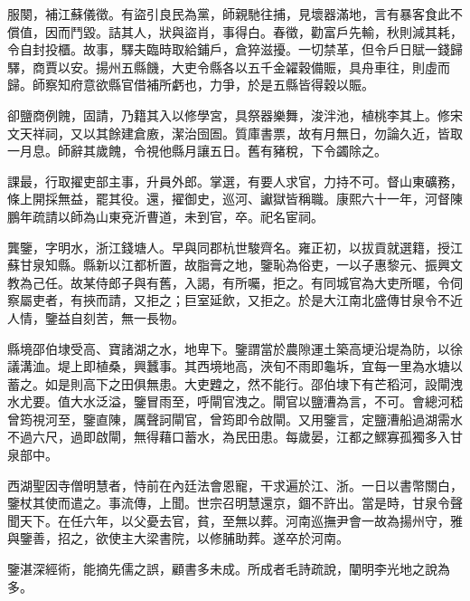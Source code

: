 \begin{pinyinscope}
服闋，補江蘇儀徵。有盜引良民為黨，師親馳往捕，見壞器滿地，言有暴客食此不償值，因而鬥毀。詰其人，狀與盜肖，事得白。春徵，勸富戶先輸，秋則減其耗，令自封投櫃。故事，驛夫臨時取給鋪戶，倉猝滋擾。一切禁革，但令戶日賦一錢歸驛，商賈以安。揚州五縣饑，大吏令縣各以五千金糴穀備賑，具舟車往，則虛而歸。師察知府意欲縣官借補所虧也，力爭，於是五縣皆得穀以賑。

卻鹽商例餽，固請，乃籍其入以修學宮，具祭器樂舞，浚泮池，植桃李其上。修宋文天祥祠，又以其餘建倉廒，潔治囹圄。質庫書票，故有月無日，勿論久近，皆取一月息。師辭其歲餽，令視他縣月讓五日。舊有豬稅，下令蠲除之。

課最，行取擢吏部主事，升員外郎。掌選，有要人求官，力持不可。督山東礦務，條上開採無益，罷其役。還，擢御史，巡河、讞獄皆稱職。康熙六十一年，河督陳鵬年疏請以師為山東兗沂曹道，未到官，卒。祀名宦祠。

龔鑒，字明水，浙江錢塘人。早與同郡杭世駿齊名。雍正初，以拔貢就選籍，授江蘇甘泉知縣。縣新以江都析置，故脂膏之地，鑒恥為俗吏，一以子惠黎元、振興文教為己任。故某侍郎子與有舊，入謁，有所囑，拒之。有同城官為大吏所暱，令伺察屬吏者，有挾而請，又拒之；巨室延飲，又拒之。於是大江南北盛傳甘泉令不近人情，鑒益自刻苦，無一長物。

縣境邵伯埭受高、寶諸湖之水，地卑下。鑒謂當於農隙運土築高埂沿堤為防，以徐議溝洫。堤上即植桑，興蠶事。其西境地高，浹旬不雨即龜坼，宜每一里為水塘以蓄之。如是則高下之田俱無患。大吏韙之，然不能行。邵伯埭下有芒稻河，設閘洩水尤要。值大水泛溢，鑒冒雨至，呼閘官洩之。閘官以鹽漕為言，不可。會總河嵇曾筠視河至，鑒直陳，厲聲訶閘官，曾筠即令啟閘。又用鑒言，定鹽漕船過湖需水不過六尺，過即啟閘，無得藉口蓄水，為民田患。每歲晏，江都之鰥寡孤獨多入甘泉部中。

西湖聖因寺僧明慧者，恃前在內廷法會恩寵，干求遍於江、浙。一日以書幣關白，鑒杖其使而遣之。事流傳，上聞。世宗召明慧還京，錮不許出。當是時，甘泉令聲聞天下。在任六年，以父憂去官，貧，至無以葬。河南巡撫尹會一故為揚州守，雅與鑒善，招之，欲使主大梁書院，以修脯助葬。遂卒於河南。

鑒湛深經術，能摘先儒之誤，顧書多未成。所成者毛詩疏說，闡明李光地之說為多。


\end{pinyinscope}